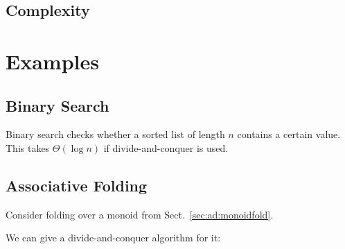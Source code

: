 \subsection{Complexity}

%
%
%
%

\section{Examples}

\subsection{Binary Search}

Binary search checks whether a sorted list of length $n$ contains a certain value.
This takes $\Theta(\log n)$ if divide-and-conquer is used.

\subsection{Associative Folding}\label{sec:ad:monoidfold:divide}

Consider folding over a monoid from Sect.~\ref{sec:ad:monoidfold}.

We can give a divide-and-conquer algorithm for it:

\begin{acode}
\end{acode}

